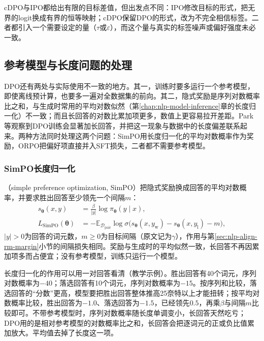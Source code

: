 cDPO与IPO都给出有限的目标差值，但出发点不同：IPO修改目标的形式，把无界的logit换成有界的恒等映射；cDPO保留DPO的形式，改为不完全相信标签。二者都引入一个需要设定的量（$\tau$或$\varepsilon$），而这个量与真实的标签噪声或偏好强度未必一致。

\subsection{参考模型与长度问题的处理}
\label{sec:nlp-align-reference-free}

DPO还有两处与实际使用不一致的地方。其一，训练时要多运行一个参考模型，即使离线预计算，也要多一遍对全数据集的前向。其二，隐式奖励是序列对数概率比之和，与生成时常用的平均对数似然（第\ref{chap:nlp-model-inference}章的长度归一化）不一致；而且长回答的对数比累加项更多，数值上更容易拉开差距。Park等观察到DPO训练会显著加长回答，并把这一现象与数据中的长度偏差联系起来。两种方法同时处理这两个问题：SimPO用长度归一化的平均对数概率作为奖励，ORPO把偏好项直接并入SFT损失，二者都不需要参考模型。

\subsubsection{SimPO长度归一化}
\label{sec:nlp-align-simpo}

（simple preference optimization, SimPO）把隐式奖励换成回答的平均对数概率，并要求胜出回答至少领先一个间隔$m$\cite{nlp-llm-simpo}：
\begin{equation}
\label{eq:nlp-align-simpo}
\begin{aligned}
 s_{\bm{\theta}}(x,y)&=\frac{\beta}{|y|}\log\pi_{\bm{\theta}}(y\mid x),\\
 L_{\mathrm{SimPO}}(\bm{\theta})
 &=-\mathbb{E}_{\mathcal{D}_{\mathrm{pair}}}
    \log\sigma\bigl(s_{\bm{\theta}}(x,y_{\mathrm w})
                  -s_{\bm{\theta}}(x,y_{\mathrm l})-m\bigr),
\end{aligned}
\end{equation}
$|y|>0$为回答的词元数，$m\ge0$为目标间隔（原文记为$\gamma$），作用与第\ref{sec:nlp-align-rm-margin}小节的间隔损失相同。奖励与生成时的平均似然一致，长回答不再因累加项多而占便宜；没有参考模型，训练只运行一个模型。

长度归一化的作用可以用一对回答看清（教学示例）。胜出回答有40个词元，序列对数概率为$-40$；落选回答有10个词元，序列对数概率为$-15$。按序列和比较，落选回答的“分数”更高，模型要把胜出回答整体推高25奈特以上才能扭转；按平均对数概率比较，胜出回答为$-1.0$、落选回答为$-1.5$，已经领先$0.5$，再乘$\beta$与间隔$m$比较即可。不带参考模型时，序列对数概率随长度单调变小，长回答天然吃亏；DPO用的是相对参考模型的对数概率比之和，长回答会把逐词元的正或负比值累加放大。平均值去掉了长度这一项。

